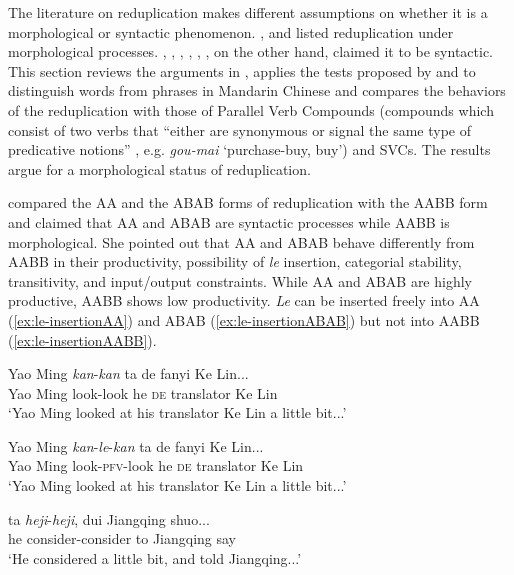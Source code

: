 The literature on reduplication makes different assumptions on whether it is a morphological or syntactic phenomenon.
\citet{Chao1968}, \citet{LiThompson1981} and \citet{Liao2014} listed reduplication under morphological processes. 
\citet{Arcodiaetal2014}, \citet{Xiong2016}, \citet{BascianoMelloni2017}, \citet{YangWei2017}, \citet{MelloniBasciano2018}, \citet{Xie2020},   on the other hand, claimed it to be syntactic.
This section reviews the arguments in \citet{Xie2020}, applies the tests proposed by \citet{Duanmu1998} and \citet{Schaefer2009} to distinguish words from phrases in Mandarin Chinese 
and compares the behaviors of the reduplication with those of Parallel Verb Compounds 
(compounds which consist of two verbs that ``either are synonymous or signal the same type of predicative notions'' \citep[68]{LiThompson1981}, e.g. \textit{gou-mai} `purchase-buy, buy') and {SVC}s. 
The results argue for a morphological status of reduplication.



\citet{Xie2020} compared the AA and the ABAB forms of reduplication with the AABB form and claimed that AA and ABAB are syntactic processes while AABB is morphological.
She pointed out that AA and ABAB behave differently from AABB in their productivity, possibility of \textit{le} insertion, categorial stability, transitivity, and input/output constraints.
While AA and ABAB are highly productive, AABB shows low productivity. 
\textit{Le} can be inserted freely into AA (\ref{ex:le-insertionAA}) and ABAB (\ref{ex:le-insertionABAB}) but not into AABB (\ref{ex:le-insertionAABB}).

\ea\label{ex:le-insertionAA}
  \ea \gll Yao Ming \textit{kan}-\textit{kan} ta de fanyi Ke Lin...\\
  Yao Ming look-look he \textsc{de} translator Ke Lin\\
  \glt `Yao Ming looked at his translator Ke Lin a little bit...'
  
  \ex \gll Yao Ming \textit{kan}-\textit{le}-\textit{kan} ta de fanyi Ke Lin...\\
  Yao Ming look-\textsc{pfv}-look he \textsc{de} translator Ke Lin\\ 
  \glt `Yao Ming looked at his translator Ke Lin a little bit...'
  \z
\z

\ea\label{ex:le-insertionABAB}
  \ea \gll ta \textit{heji}-\textit{heji}, dui Jiangqing shuo...\\
  he consider-consider to Jiangqing say\\
 \glt `He considered a little bit, and told Jiangqing...'
 
